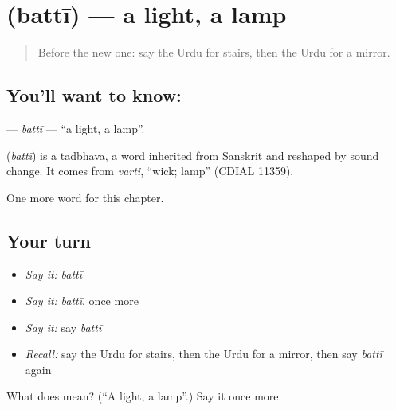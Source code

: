 \section[\texorpdfstring{\ur{بتی} (battī)}{بتی (battī)}]{ (battī) — a light, a lamp}

\label{lesson:UR-C59-batti}



\begin{quote}
Before the new one: say the Urdu for stairs, then the Urdu for a mirror.
\end{quote}

\subsection*{You'll want to know: }
\textbf{} — \emph{battī} — \textquotedblleft{}a light, a lamp\textquotedblright{}.

\begin{cousinweb}
\textbf{} (\emph{battī}) is a tadbhava, a word inherited from Sanskrit and reshaped by sound change. It comes from \emph{varti}, \textquotedblleft{}wick; lamp\textquotedblright{} (CDIAL 11359).
\end{cousinweb}

\begin{grammarlens}[title={What you've built}]
One more word for this chapter.
\end{grammarlens}

\subsection*{Your turn}
\begin{itemize}
\raggedright
  \item \emph{Say it:} \emph{battī}
  \item \emph{Say it:} \emph{battī}, once more
  \item \emph{Say it:} say \emph{battī}
  \item \emph{Recall:} say the Urdu for stairs, then the Urdu for a mirror, then say \emph{battī} again
\end{itemize}

\begin{tcolorbox}[breakable,colback=teal!4,colframe=teal!35!black,title={Before you move on}]
What does  mean? (\textquotedblleft{}A light, a lamp\textquotedblright{}.) Say it once more.
\end{tcolorbox}
